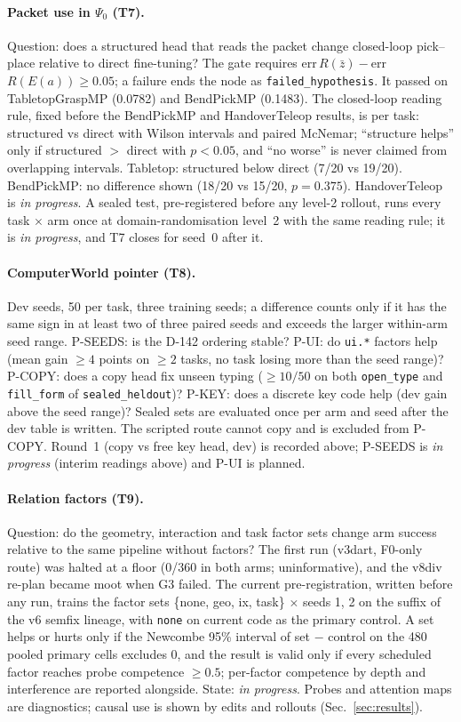 \documentclass[10pt,twocolumn]{article}
\begin{document}
\paragraph{Packet use in $\Psi_0$ (T7).} Question: does a structured head that reads the packet change closed-loop pick--place relative to direct fine-tuning? The gate requires err\,$R(\bar z)-$err\,$R(E(a))\ge0.05$; a failure ends the node as \texttt{failed\_hypothesis}. It passed on TabletopGraspMP (0.0782) and BendPickMP (0.1483). The closed-loop reading rule, fixed before the BendPickMP and HandoverTeleop results, is per task: structured vs direct with Wilson intervals and paired McNemar; ``structure helps'' only if structured $>$ direct with $p<0.05$, and ``no worse'' is never claimed from overlapping intervals. Tabletop: structured below direct (7/20 vs 19/20). BendPickMP: no difference shown (18/20 vs 15/20, $p{=}0.375$). HandoverTeleop is \emph{in progress}. A sealed test, pre-registered before any level-2 rollout, runs every task $\times$ arm once at domain-randomisation level~2 with the same reading rule; it is \emph{in progress}, and T7 closes for seed~0 after it.

\paragraph{ComputerWorld pointer (T8).} Dev seeds, 50 per task, three training seeds; a difference counts only if it has the same sign in at least two of three paired seeds and exceeds the larger within-arm seed range. P-SEEDS: is the D-142 ordering stable? P-UI: do \texttt{ui.*} factors help (mean gain $\ge4$ points on $\ge2$ tasks, no task losing more than the seed range)? P-COPY: does a copy head fix unseen typing ($\ge10/50$ on both \texttt{open\_type} and \texttt{fill\_form} of \texttt{sealed\_heldout})? P-KEY: does a discrete key code help (dev gain above the seed range)? Sealed sets are evaluated once per arm and seed after the dev table is written. The scripted route cannot copy and is excluded from P-COPY. Round~1 (copy vs free key head, dev) is recorded above; P-SEEDS is \emph{in progress} (interim readings above) and P-UI is planned.

\paragraph{Relation factors (T9).} Question: do the geometry, interaction and task factor sets change arm success relative to the same pipeline without factors? The first run (v3dart, F0-only route) was halted at a floor (0/360 in both arms; uninformative), and the v8div re-plan became moot when G3 failed. The current pre-registration, written before any run, trains the factor sets \{none, geo, ix, task\} $\times$ seeds 1, 2 on the suffix of the v6 semfix lineage, with \texttt{none} on current code as the primary control. A set helps or hurts only if the Newcombe 95\% interval of set $-$ control on the 480 pooled primary cells excludes 0, and the result is valid only if every scheduled factor reaches probe competence $\ge0.5$; per-factor competence by depth and interference are reported alongside. State: \emph{in progress}. Probes and attention maps are diagnostics; causal use is shown by edits and rollouts (Sec.~\ref{sec:results}).
\end{document}
